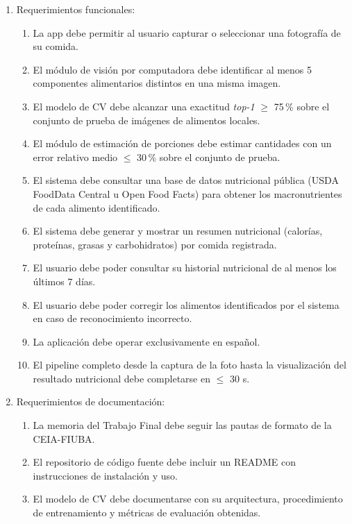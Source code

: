 \documentclass[
11pt, %
]{charter}
\begin{document}
\begin{enumerate}
	\item Requerimientos funcionales:
		\begin{enumerate}
			\item[RF1] La app debe permitir al usuario capturar o seleccionar una fotografía de su comida.
			\item[RF2] El módulo de visión por computadora debe identificar al menos 5 componentes alimentarios distintos en una misma imagen.
			\item[RF3] El modelo de CV debe alcanzar una exactitud \textit{top-1} $\geq$ 75\,\% sobre el conjunto de prueba de imágenes de alimentos locales.
			\item[RF4] El módulo de estimación de porciones debe estimar cantidades con un error relativo medio $\leq$ 30\,\% sobre el conjunto de prueba.
			\item[RF5] El sistema debe consultar una base de datos nutricional pública (USDA FoodData Central u Open Food Facts) para obtener los macronutrientes de cada alimento identificado.
			\item[RF6] El sistema debe generar y mostrar un resumen nutricional (calorías, proteínas, grasas y carbohidratos) por comida registrada.
			\item[RF7] El usuario debe poder consultar su historial nutricional de al menos los últimos 7 días.
			\item[RF8] El usuario debe poder corregir los alimentos identificados por el sistema en caso de reconocimiento incorrecto.
			\item[RF9] La aplicación debe operar exclusivamente en español.
			\item[RF10] El pipeline completo desde la captura de la foto hasta la visualización del resultado nutricional debe completarse en $\leq$ 30 s.
		\end{enumerate}
	\item Requerimientos de documentación:
		\begin{enumerate}
			\item[RD1] La memoria del Trabajo Final debe seguir las pautas de formato de la CEIA-FIUBA.
			\item[RD2] El repositorio de código fuente debe incluir un README con instrucciones de instalación y uso.
			\item[RD3] El modelo de CV debe documentarse con su arquitectura, procedimiento de entrenamiento y métricas de evaluación obtenidas.
		\end{enumerate}

\end{enumerate}
\end{document}
